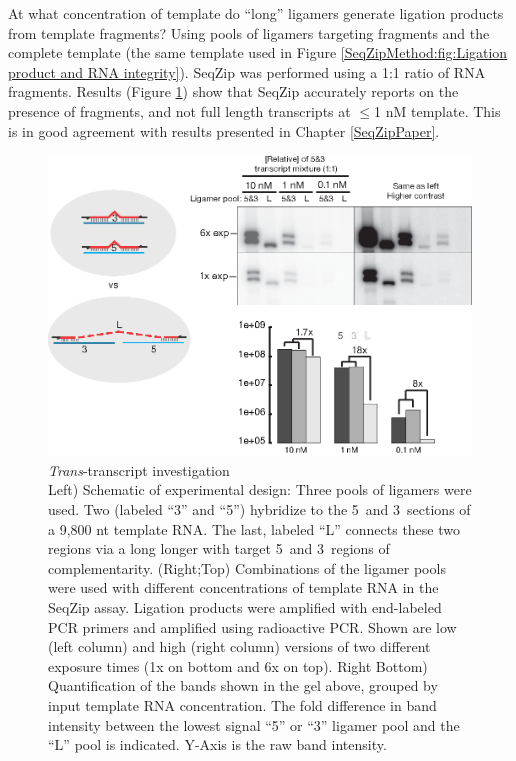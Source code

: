     At what concentration of template do ``long'' ligamers generate ligation products from template fragments? Using pools of ligamers targeting fragments and the complete template (the same template used in Figure \ref{SeqZipMethod:fig:Ligation product and RNA integrity}). SeqZip was performed using a 1:1 ratio of RNA fragments. Results (Figure \ref{SeqZipMethod:fig: trans Tx for degradation}) show that SeqZip accurately reports on the presence of fragments, and not full length transcripts at $\le$1 nM template. This is in good agreement with results presented in Chapter \ref{SeqZipPaper}. 

  	\begin{figure} %
    	\centering 
    	\includegraphics{Figures/SeqZipMethod/TransRNAWithSeqZip.eps}
    	\caption[Trans Transcript investigation]
    	{
	      \textit{Trans}-transcript investigation\\[0.25cm]
  	    Left) Schematic of experimental design: Three pools of ligamers were used. Two (labeled ``3'' and ``5'') hybridize to the 5\textprime~and 3\textprime~sections of a 9,800 nt template RNA. The last, labeled ``L'' connects these two regions via a long longer with target 5\textprime~and 3\textprime~regions of complementarity. (Right;Top) Combinations of the ligamer pools were used with different concentrations of template RNA in the SeqZip assay. Ligation products were amplified with end-labeled PCR primers and amplified using radioactive PCR. Shown are low (left column) and high (right column) versions of two different exposure times (1x on bottom and 6x on top). Right Bottom) Quantification of the bands shown in the gel above, grouped by input template RNA concentration. The fold difference in band intensity between the lowest signal ``5'' or ``3'' ligamer pool and the ``L'' pool is indicated. Y-Axis is the raw band intensity.
		    }
   	 \label{SeqZipMethod:fig: trans Tx for degradation}
	 	 \end{figure}

